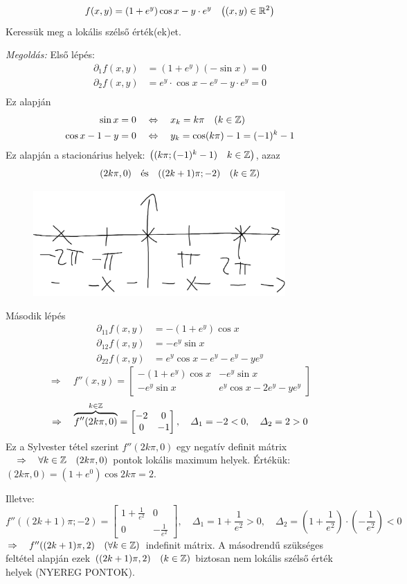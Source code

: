 \documentclass[a4paper,11.5pt]{article}
\begin{document}
	\begin{task}
		\[ f(x,y)=(1+e^y)\cos x-y\cdot e^y\quad \big((x,y)\in\mathbb{R}^2 \big) \]
		Keressük meg a lokális szélső érték(ek)et.
		
		\textit{Megoldás:} Első lépés:
		\begin{align*}
			\partial_1f(x,y)&=(1+e^y)(-\sin x)=0\\
			\partial_2f(x,y)&=e^y\cdot\cos x-e^y-y\cdot e^y=0\\
		\end{align*}
		Ez alapján
		\begin{align*}
			\sin x=0\quad &\Leftrightarrow\quad x_k=k\pi\quad (k\in\mathbb{Z})\\
			\cos x-1-y=0\quad &\Leftrightarrow\quad y_k=\cos(k\pi)-1=(-1)^k-1
		\end{align*}
		Ez alapján a stacionárius helyek: $\big((k\pi; (-1)^k-1)\quad k\in\mathbb{Z}\big)$, azaz
		\[ (2k\pi,0)\quad \text{és}\quad ((2k+1)\pi; -2) \quad (k\in\mathbb{Z})\]
		\begin{figure}[H]
			\centering
			\includegraphics[height=4cm]{../2zh/kepek/39.png}
			\caption{}
		\end{figure}
		Második lépés
		\begin{align*}
			\partial_{11}f(x,y)&=-(1+e^y)\cos x\\
			\partial_{12}f(x,y)&=-e^y\sin x\\
			\partial_{22}f(x,y)&=e^y\cos x-e^y-e^y-ye^y
		\end{align*}
		\[ \Rightarrow\quad f''(x,y)=\begin{bmatrix}
			-(1+e^y)\cos x&-e^y\sin x\\
			-e^y\sin x&e^y\cos x-2e^y-ye^y
		\end{bmatrix}\]
		\[ \Rightarrow\quad \overbrace{f''(2k\pi,0)}^{k\in\mathbb{Z}}=\begin{bmatrix}
			-2&0\\
			0&-1
		\end{bmatrix},\quad \varDelta_1=-2<0, \quad \varDelta_2=2>0 \]
		Ez a Sylvester tétel szerint $f''(2k\pi,0)$ egy negatív definit mátrix$\quad \Rightarrow\quad \forall k\in\mathbb{Z} \quad (2k\pi,0)$ pontok lokális maximum helyek. Értékük: $(2k\pi,0)=(1+e^0)\cos2k\pi=2$.
		
		Illetve:
		\[f''((2k+1)\pi;-2)=\begin{bmatrix}
			1+\frac{1}{e^2}&0\\
			0&-\frac{1}{e^2}
		\end{bmatrix},\quad \varDelta_1=1+\frac{1}{e^2}>0,\quad \varDelta_2=\left(1+\frac{1}{e^2}\right)\cdot\left(-\frac{1}{e^2}\right)<0 \]
		$\Rightarrow\quad f''((2k+1)\pi,2)\quad (\forall k\in\mathbb{Z})$ indefinit mátrix. A másodrendű szükséges feltétel alapján ezek $((2k+1)\pi,2)\quad (k\in\mathbb{Z})$ biztosan nem lokális szélső érték helyek (NYEREG PONTOK).
	\end{task}
\end{document}
